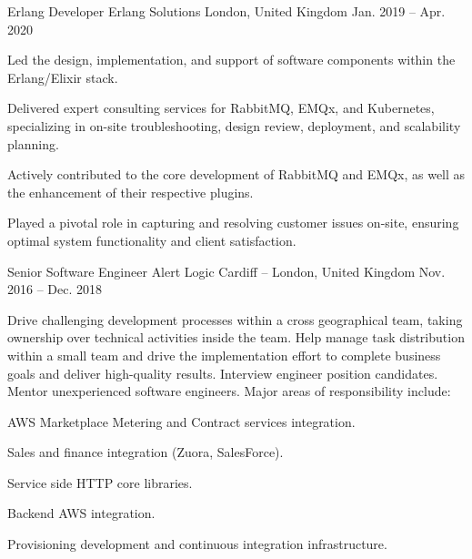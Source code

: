 \begin{cventries}
  \cventry
    {Erlang Developer} %
    {Erlang Solutions} %
    {London, United Kingdom} %
    {Jan. 2019 – Apr. 2020} %
    {
      \begin{cvitems} %
        \item {Led the design, implementation, and support of software components within the Erlang/Elixir stack.}
        \item {Delivered expert consulting services for RabbitMQ, EMQx, and Kubernetes, specializing in on-site troubleshooting, design review, deployment, and scalability planning.}
        \item {Actively contributed to the core development of RabbitMQ and EMQx, as well as the enhancement of their respective plugins.}
        \item {Played a pivotal role in capturing and resolving customer issues on-site, ensuring optimal system functionality and client satisfaction.}
      \end{cvitems}
    }

  \cventry
    {Senior Software Engineer} %
    {Alert Logic} %
    {Cardiff -- London, United Kingdom} %
    {Nov. 2016 – Dec. 2018} %
    {
      \responsibilities
        {Drive challenging development processes within a cross
        geographical team, taking ownership over technical activities
        inside the team. Help manage task distribution within a small
        team and drive the implementation effort to complete business
        goals and deliver high-quality results. Interview engineer
        position candidates. Mentor unexperienced software
        engineers. Major areas of responsibility include:}
      \begin{cvitems} %
        \item {AWS Marketplace Metering and Contract services integration.}
        \item {Sales and finance integration (Zuora, SalesForce).}
        \item {Service side HTTP core libraries.}
        \item {Backend AWS integration.}
        \item {Provisioning development and continuous integration infrastructure.}
      \end{cvitems}
    }


\end{cventries}

